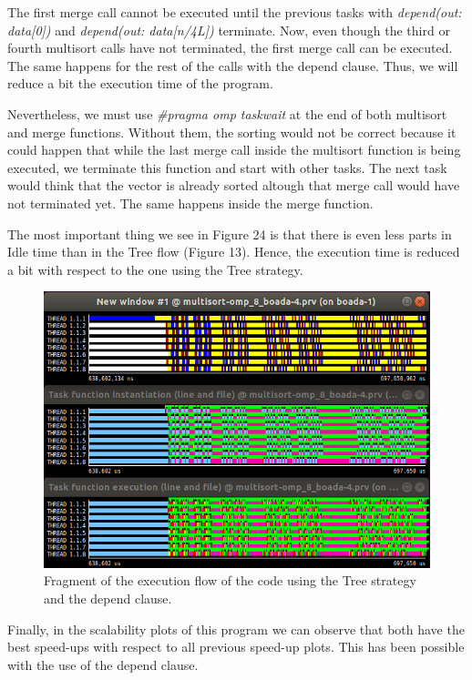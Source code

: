 \documentclass[12pt, a4paper]{article}
\begin{document}
The first merge call cannot be executed until the previous tasks with \textit{depend(out: data[0])} and \textit{depend(out: data[n/4L])} terminate. Now, even though the third or fourth multisort calls have not terminated, the first merge call can be executed. The same happens for the rest of the calls with the depend clause. Thus, we will reduce a bit the execution time of the program.

Nevertheless, we must use \textit{\#pragma omp taskwait} at the end of both multisort and merge functions. Without them, the sorting would not be correct because it could happen that while the last merge call inside the multisort function is being executed, we terminate this function and start with other tasks. The next task would think that the vector is already sorted altough that merge call would have not terminated yet. The same happens inside the merge function.

The most important thing we see in Figure 24 is that there is even less parts in Idle time than in the Tree flow (Figure 13). Hence, the execution time is reduced a bit with respect to the one using the Tree strategy.

\begin{figure}[H]
	\centering
	\includegraphics[scale=0.45]{./images/S3/Tree_depend_paraver}

	\label{fig:depend_tree}	
	\caption{Fragment of the execution flow of the code using the Tree strategy and the depend clause.}
\end{figure}

Finally, in the scalability plots of this program we can observe that both have the best speed-ups with respect to all previous speed-up plots. This has been possible with the use of the depend clause.
\end{document}
